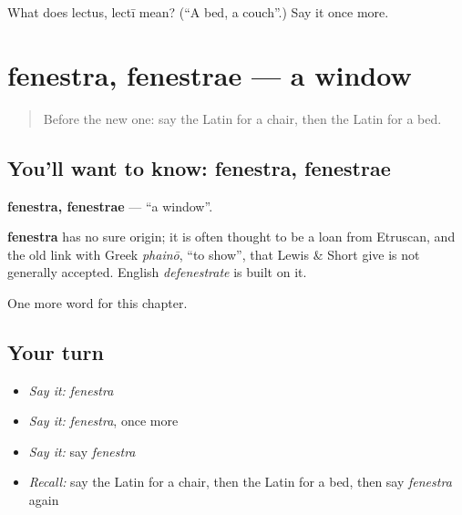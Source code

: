 \begin{tcolorbox}[breakable,colback=teal!4,colframe=teal!35!black,title={Before you move on}]
What does lectus, lectī mean? (\textquotedblleft{}A bed, a couch\textquotedblright{}.) Say it once more.
\end{tcolorbox}
\section[fenestra, fenestrae]{fenestra, fenestrae — a window}

\label{lesson:LA-C82-fenestra}



\begin{quote}
Before the new one: say the Latin for a chair, then the Latin for a bed.
\end{quote}

\subsection*{You'll want to know: fenestra, fenestrae}
\textbf{fenestra, fenestrae} — \textquotedblleft{}a window\textquotedblright{}.

\begin{cousinweb}
\textbf{fenestra} has no sure origin; it is often thought to be a loan from Etruscan, and the old link with Greek \emph{phainō}, \textquotedblleft{}to show\textquotedblright{}, that Lewis \& Short give is not generally accepted. English \emph{defenestrate} is built on it.
\end{cousinweb}

\begin{grammarlens}[title={What you've built}]
One more word for this chapter.
\end{grammarlens}

\subsection*{Your turn}
\begin{itemize}
\raggedright
  \item \emph{Say it:} \emph{fenestra}
  \item \emph{Say it:} \emph{fenestra}, once more
  \item \emph{Say it:} say \emph{fenestra}
  \item \emph{Recall:} say the Latin for a chair, then the Latin for a bed, then say \emph{fenestra} again
\end{itemize}

